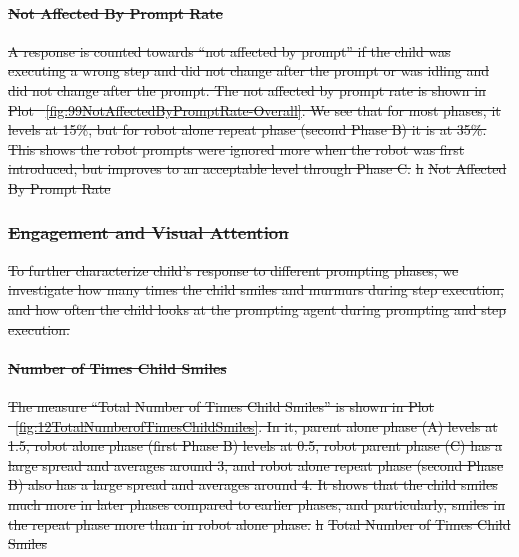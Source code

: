\documentclass{ut-thesis}
\providecommand{\DIFdeltex}[1]{{\protect\color{red}\sout{#1}}}                      %
\providecommand{\DIFdelFL}[1]{\DIFdel{#1}} %
\providecommand{\DIFdel}[1]{\texorpdfstring{\DIFdeltex{#1}}{}} %
\begin{document}
\paragraph{\DIFdel{Not Affected By Prompt Rate}}
\addtocounter{paragraph}{-1}%
\DIFdel{A response is counted towards ``not affected by prompt'' if the child was executing a wrong step and did not change after the prompt or was idling and did not change after the prompt.  The not affected by prompt rate is shown in Plot \ \ref{fig:99NotAffectedByPromptRate-Overall}.  We see that for most phases, it levels at 15\%, but for robot alone repeat phase (second Phase B) it is at 35\%.  This shows the robot prompts were ignored more when the robot was first introduced, but improves to an acceptable level through Phase C.
}%
\DIFdelFL{h}%
{%
\DIFdelFL{Not Affected By Prompt Rate}}

\subsubsection{\DIFdel{Engagement and Visual Attention}}
\addtocounter{subsubsection}{-1}%
\DIFdel{To further characterize child's response to different prompting phases, we investigate how many times the child smiles and murmurs during step execution, and how often the child looks at the prompting agent during prompting and step execution.
}%

\paragraph{\DIFdel{Number of Times Child Smiles}}
\addtocounter{paragraph}{-1}%
\DIFdel{The measure ``Total Number of Times Child Smiles'' is shown in Plot \ \ref{fig:12TotalNumberofTimesChildSmiles}.  In it, parent alone phase (A) levels at 1.5, robot alone phase (first Phase B) levels at 0.5, robot parent phase (C) has a large spread and averages around 3, and robot alone repeat phase (second Phase B) also has a large spread and averages around 4.  It shows that the child smiles much more in later phases compared to earlier phases, and particularly, smiles in the repeat phase more than in robot alone phase.
}%
\DIFdelFL{h}%
{%
\DIFdelFL{Total Number of Times Child Smiles}}
\end{document}
